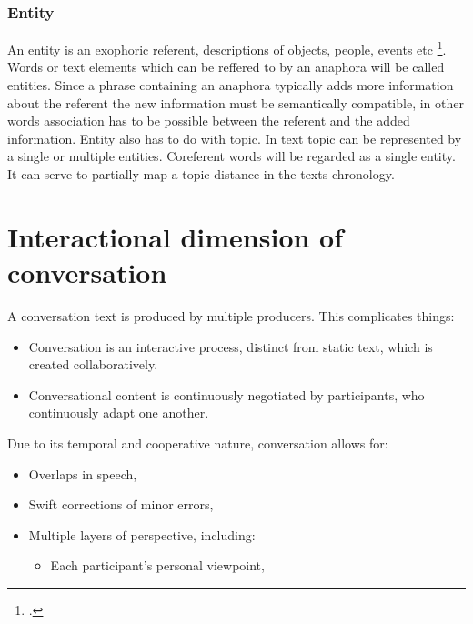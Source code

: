 \documentclass[12pt]{report}
\begin{document}
{\subsubsection{Entity}
\par
    An entity is an exophoric referent, descriptions of objects, people, events etc \footcite{entities}.
    Words or text elements which can be reffered to by an anaphora will be called entities.
    Since a phrase containing an anaphora typically adds more information about the referent
    the new information must be semantically compatible,
    in other words association has to be possible between the referent and the added information.
    Entity also has to do with topic.
    In text topic can be represented by a single or multiple entities.
    Coreferent words will be regarded as a single entity.
    It can serve to partially map a topic distance in the texts chronology.

\section{Interactional dimension of conversation}
\par
A conversation text is produced by multiple producers.
This complicates things:

\begin{itemize}

    \item
    Conversation is an interactive process, distinct from static text, which is created collaboratively.

    \item
    Conversational content is continuously negotiated by participants, who continuously adapt one another.

\end{itemize}

Due to its temporal and cooperative nature, conversation allows for:
\begin{itemize}

    \item
    Overlaps in speech,

    \item
    Swift corrections of minor errors,

    \item
    Multiple layers of perspective, including:
        \begin{itemize}

            \item
            Each participant’s personal viewpoint,


\end{itemize}
\end{itemize}}
\end{document}
